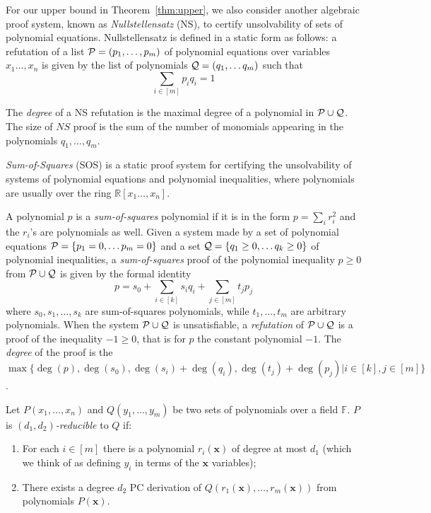 \medskip

For our upper bound in Theorem~\ref{thm:upper}, we also consider another algebraic proof system, known as {\em Nullstellensatz} (NS), to certify unsolvability of sets of polynomial equations. Nullstellensatz  is defined in a static form as follows:  a  refutation of a list  ${\cal P}=(p_1,\ldots,p_m)$ of polynomial equations over variables $x_1\ldots,x_n$ 
is given by the list of polynomials  ${\cal Q}=(q_1,\ldots q_m)$  such that
$$
\sum_{i \in [m]} p_iq_i =1
$$

The {\em degree} of a NS refutation is the maximal degree of a polynomial in ${\cal P} \cup {\cal Q}$. The size of $NS$ proof is the sum of the number of monomials appearing in the polynomials
$q_1,\ldots, q_m$.

\medskip

{\em Sum-of-Squares} (SOS) is a static proof system for certifying the unsolvability of systems of polynomial equations and polynomial inequalities, where polynomials are usually over the ring $\mathbb R[x_1\ldots, x_n]$.    

A polynomial $p$ is a {\em sum-of-squares} polynomial if it is in the form $p=\sum_{i} r_i^2$ and the $r_i$'s  are polynomials as well.  Given a system made by a set of polynomial equations  
 ${\cal P} =\{p_1=0,\ldots p_m=0\}$ and a set ${\cal Q}=\{q_1\geq 0,\ldots q_k\geq 0\}$ of polynomial inequalities, a {\em sum-of-squares} proof of the polynomial inequality $p\geq 0 $ from ${\cal P} \cup {\cal Q}$  is  given by the  formal identity
 $$
 p= s_0+\sum_{i\in [k]}s_iq_i + \sum_{j \in [m]}t_jp_j
 $$
where $s_0,s_1,\ldots, s_k$ are sum-of-squares polynomials, while $t_1,\ldots,t_m$ are arbitrary polynomials.  When the system  ${\cal P} \cup {\cal Q}$  is unsatisfiable, a {\em refutation} of ${\cal P} \cup {\cal Q}$ is a proof of the inequality $-1\geq 0$, that is for  $p$ the constant polynomial $-1$. The {\em degree} of the proof is 
the $\max \{\deg(p),\deg(s_0), \deg(s_i)+\deg(q_i), \deg(t_j)+\deg(p_j) | i \in [k], j \in[m]\}$.   


\medskip 

\begin{definition} \label{def:reduction}
Let $P(x_1,\ldots,x_n)$ and $Q(y_1,\ldots, y_m)$ be two sets of polynomials over a field $\mathbb F$.  
$P$ is \emph{$(d_1,d_2)$-reducible} to $Q$ if:
\begin{enumerate}
\item For each $i \in [m]$ there is a polynomial $r_i(\mathbf{x})$ of degree at most $d_1$  (which we think of as defining $y_i$ in terms of the $\mathbf x$ variables);
\item There exists a degree $d_2$ PC derivation of $Q(r_1(\mathbf x),\ldots, r_m(\mathbf x) )$ from polynomials $P(\mathbf x)$.
\end{enumerate}
\end{definition}

